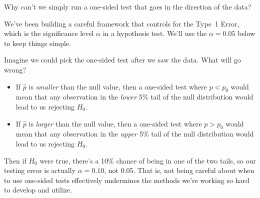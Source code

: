 \begin{example}{

    Why can't we simply run a one-sided
    test that goes in the direction of the data?}
  We've been building a careful framework that
  controls for the Type~1 Error, which is the
  significance level $\alpha$ in a hypothesis test.
  We'll use the $\alpha = 0.05$ below to keep
  things simple.

  Imagine we could pick the one-sided test after
  we saw the data. What will go wrong?
  \begin{itemize}
  \item If $\hat{p}$ is \emph{smaller} than
      the null value,
      then a one-sided test where $p < p_0$ would
      mean that any observation in the
      \emph{lower} 5\% tail of the null distribution
      would lead to us rejecting $H_0$.
  \item If $\hat{p}$ is \emph{larger} than
      the null value,
      then a one-sided test where $p > p_0$ would
      mean that any observation in the
      \emph{upper} 5\% tail of the null distribution
      would lead to us rejecting $H_0$.
  \end{itemize}
  Then if $H_0$ were true, there's a 10\% chance of
  being in one of the two tails, so our testing error
  is actually $\alpha = 0.10$, not 0.05.
  That is,
  not being careful about when to use one-sided tests
  effectively undermines the methods we're working
  so hard to develop and utilize.
\end{example}







